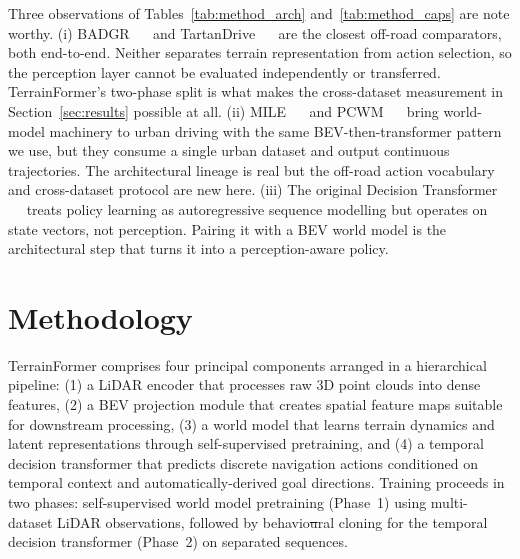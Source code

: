 \documentclass[sensors,article,submit,pdftex,moreauthors]{Definitions/mdpi}
\makeatletter
\providecommand{\DIFadd}[1]{{\protect\color{red}#1}} %
\providecommand{\DIFdel}[1]{{\protect\color{red}\sout{#1}}} %
\providecommand{\DIFaddend}{} %
\providecommand{\DIFdelbegin}{} %
\providecommand{\DIFdelend}{} %
\providecommand{\DIFscaledelfig}{0.5}
\newlength{\DIFdelgraphicswidth} %
\newlength{\DIFdelgraphicsheight} %
\providecommand{\DIFdelincludegraphics}[2][]{%
\sbox{\DIFdelgraphicsbox}{\DIFOincludegraphics[#1]{#2}}%
\settoboxwidth{\DIFdelgraphicswidth}{\DIFdelgraphicsbox} %
\settoboxtotalheight{\DIFdelgraphicsheight}{\DIFdelgraphicsbox} %
\scalebox{\DIFscaledelfig}{%
\parbox[b]{\DIFdelgraphicswidth}{\usebox{\DIFdelgraphicsbox}\\[-\baselineskip] \rule{\DIFdelgraphicswidth}{0em}}\llap{\resizebox{\DIFdelgraphicswidth}{\DIFdelgraphicsheight}{%
\setlength{\unitlength}{\DIFdelgraphicswidth}%
\begin{picture}(1,1)%
\thicklines\linethickness{2pt} %
{\color[rgb]{1,0,0}\put(0,0){\framebox(1,1){}}}%
{\color[rgb]{1,0,0}\put(0,0){\line( 1,1){1}}}%
{\color[rgb]{1,0,0}\put(0,1){\line(1,-1){1}}}%
\end{picture}%
}\hspace*{3pt}}} %
} %
\DeclareRobustCommand{\DIFaddend}{\DIFOaddend \let\includegraphics\DIFOincludegraphics} %
\DeclareRobustCommand{\DIFdelbegin}{\DIFOdelbegin \let\includegraphics\DIFdelincludegraphics} %
\DeclareRobustCommand{\DIFdelend}{\DIFOaddend \let\includegraphics\DIFOincludegraphics} %
\let\sout@orig\sout %
\renewcommand{\sout}[1]{\ifmmode\text{\sout@orig{\ensuremath{#1}}}\else\sout@orig{#1}\fi} %
\makeatother
\begin{document}
\DIFadd{Three observations of Tables~\ref{tab:method_arch} and~\ref{tab:method_caps} are note worthy. (i) BADGR \mbox{%
\cite{kahn2021} }\hskip0pt%
and TartanDrive \mbox{%
\cite{triest2023} }\hskip0pt%
are the closest off-road comparators, both end-to-end. Neither separates terrain representation from action selection, so the perception layer cannot be evaluated independently or transferred. TerrainFormer's two-phase split is what makes the cross-dataset measurement in Section~\ref{sec:results} possible at all. (ii) MILE \mbox{%
\cite{hu2022} }\hskip0pt%
and PCWM \mbox{%
\cite{yang2023} }\hskip0pt%
bring world-model machinery to urban driving with the same BEV-then-transformer pattern we use, but they consume a single urban dataset and output continuous trajectories. The architectural lineage is real but the off-road action vocabulary and cross-dataset protocol are new here. (iii) The original Decision Transformer \mbox{%
\cite{chen2021} }\hskip0pt%
treats policy learning as autoregressive sequence modelling but operates on state vectors, not perception. Pairing it with a BEV world model is the architectural step that turns it into a perception-aware policy.
}

\DIFaddend %
\section{Methodology}
\label{sec:methodology}

TerrainFormer comprises four principal components arranged in a hierarchical pipeline: (1) a LiDAR encoder that processes raw 3D point clouds into dense features, (2) a BEV projection module that creates spatial feature maps suitable for downstream processing, (3) a world model that learns terrain dynamics and latent representations through self-supervised pretraining, and (4) a temporal decision transformer that predicts discrete navigation actions conditioned on temporal context and automatically-derived goal directions. Training proceeds in two phases: self-supervised world model pretraining (Phase~1) using multi-dataset LiDAR observations, followed by behavio\DIFdelbegin \DIFdel{u}\DIFdelend ral cloning for the temporal decision transformer (Phase~2) on separated sequences.
\end{document}
